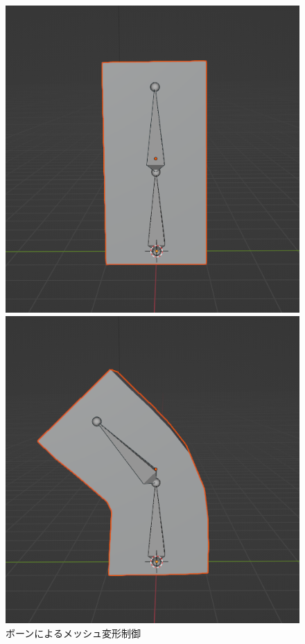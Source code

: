 \documentclass{ltjsreport}
\begin{document}
			\begin{figure}[H]
			\centering
			\begin{minipage}{0.3\columnwidth}
			\centering
			\includegraphics[width = \columnwidth]{../figs/bone1.png}
			\end{minipage}
			\hspace{0.04\columnwidth}
			\begin{minipage}{0.3\columnwidth}
			\centering
			\includegraphics[width = \columnwidth]{../figs/bonecheck.png}
			\end{minipage}
			\caption{ボーンによるメッシュ変形制御}
			\end{figure}
\end{document}
